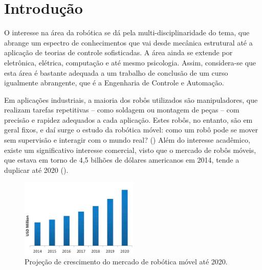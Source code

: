 \section{Introdução}


O interesse na área da robótica se dá pela multi-disciplinaridade do tema, que abrange um espectro de conhecimentos que vai desde mecânica estrutural até a aplicação de teorias de controle sofisticadas. A área ainda se extende por eletrônica, elétrica, computação e até mesmo psicologia. Assim, considera-se que esta área é bastante adequada a um trabalho de conclusão de um curso igualmente abrangente, que é a Engenharia de Controle e Automação.

Em aplicações industriais, a maioria dos robôs utilizados são manipuladores, que realizam tarefas repetitivas -- como soldagem ou montagem de peças -- com precisão e rapidez adequados a cada aplicação. Estes robôs, no entanto, são em geral fixos, e daí surge o estudo da robótica móvel: como um robô pode se mover sem supervisão e interagir com o mundo real? (\cite{siegwart2011introduction}) Além do interesse acadêmico, existe um significativo interesse comercial, visto que o mercado de robôs móveis, que estava em torno de 4,5 bilhões de dólares americanos em 2014, tende a duplicar até 2020 (\cite{marketsmarkets}).

\begin{figure}[h]
  \centering
  \includegraphics[width = 0.5\textwidth]{imagens/markets}
  \caption{Projeção de crescimento do mercado de robótica móvel até 2020.}
  \label{fig:markets}
\end{figure}

